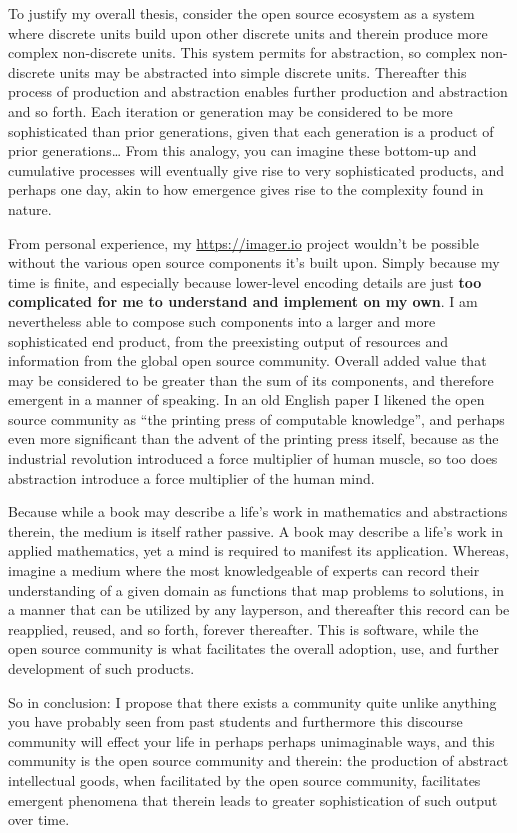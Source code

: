 To justify my overall thesis, consider the open source ecosystem as a system where discrete units build upon other discrete units and therein produce more complex non-discrete units. This system permits for abstraction, so complex non-discrete units may be abstracted into simple discrete units. Thereafter this process of production and abstraction enables further production and abstraction and so forth. Each iteration or generation may be considered to be more sophisticated than prior generations, given that each generation is a product of prior generations… From this analogy, you can imagine these bottom-up and cumulative processes will eventually give rise to very sophisticated products, and perhaps one day, akin to how emergence gives rise to the complexity found in nature.

From personal experience, my \url{https://imager.io} project wouldn’t be possible without the various open source components it’s built upon. Simply because my time is finite, and especially because lower-level encoding details are just \textbf{too complicated for me to understand and implement on my own}. I am nevertheless able to compose such components into a larger and more sophisticated end product, from the preexisting output of resources and information from the global open source community. Overall added value that may be considered to be greater than the sum of its components, and therefore emergent in a manner of speaking. In an old English paper I likened the open source community as ``the printing press of computable knowledge'', and perhaps even more significant than the advent of the printing press itself, because as the industrial revolution introduced a force multiplier of human muscle, so too does abstraction introduce a force multiplier of the human mind.

Because while a book may describe a life’s work in mathematics and abstractions therein, the medium is itself rather passive. A book may describe a life’s work in applied mathematics, yet a mind is required to manifest its application. Whereas, imagine a medium where the most knowledgeable of experts can record their understanding of a given domain as functions that map problems to solutions, in a manner that can be utilized by any layperson, and thereafter this record can be reapplied, reused, and so forth, forever thereafter. This is software, while the open source community is what facilitates the overall adoption, use, and further development of such products. 


So in conclusion: I propose that there exists a community quite unlike anything you have probably seen from past students and furthermore this discourse community will effect your life in perhaps perhaps unimaginable ways, and this community is the open source community and therein: the production of abstract intellectual goods, when facilitated by the open source community, facilitates emergent phenomena that therein leads to greater sophistication of such output over time. 

